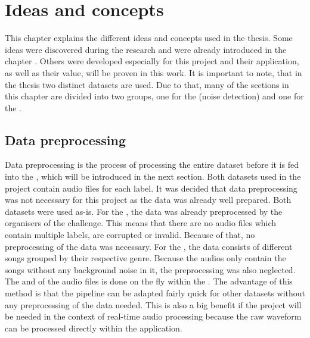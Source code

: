 \chapter{Ideas and concepts}
\label{ch:Ideas-Concepts}
This chapter explains the different ideas and concepts used in the thesis. Some ideas were discovered during the research and were already introduced in the chapter . Others were developed especially for this project and their application, as well as their value, will be proven in this work.
\newline
\newline
It is important to note, that in the thesis two distinct datasets are used. Due to that, many of the sections in this chapter are divided into two groups, one for the  (noise detection) and one for the .

\section{Data preprocessing}
\label{sec:Data-Preprocessing}
Data preprocessing is the process of processing the entire dataset before it is fed into the , which will be introduced in the next section. Both datasets used in the project contain audio files for each label. It was decided that data preprocessing was not necessary for this project as the data was already well prepared. Both datasets were used as-is.
\newline
\newline
For the , the data was already preprocessed by the organisers of the challenge. This means that there are no audio files which contain multiple labels, are corrupted or invalid. Because of that, no preprocessing of the data was necessary.
\newline
\newline
For the , the data consists of different songs grouped by their respective genre. Because the audios only contain the songs without any background noise in it, the preprocessing was also neglected.
\newline
\newline
The  and  of the audio files is done on the fly within the . The advantage of this method is that the pipeline can be adapted fairly quick for other datasets without any preprocessing of the data needed. This is also a big benefit if the project will be needed in the context of real-time audio processing because the raw waveform can be processed directly within the application.

